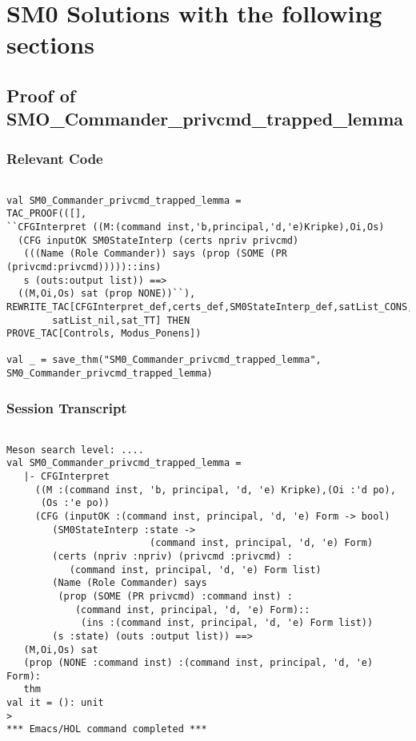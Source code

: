 \documentclass{report}
\begin{document}
\chapter{SM0 Solutions with the following sections}
\label{sm0-solutions}

\section{Proof of SMO_Commander_privcmd_trapped_lemma}
\label{proof-1}

\subsection{Relevant Code}
\label{rel-code-1}
\begin{lstlisting}[frame=TBlr]

val SM0_Commander_privcmd_trapped_lemma =
TAC_PROOF(([],
``CFGInterpret ((M:(command inst,'b,principal,'d,'e)Kripke),Oi,Os)
  (CFG inputOK SM0StateInterp (certs npriv privcmd)
   (((Name (Role Commander)) says (prop (SOME (PR (privcmd:privcmd)))))::ins)
   s (outs:output list)) ==>
  ((M,Oi,Os) sat (prop NONE))``),
REWRITE_TAC[CFGInterpret_def,certs_def,SM0StateInterp_def,satList_CONS,
	    satList_nil,sat_TT] THEN
PROVE_TAC[Controls, Modus_Ponens])

val _ = save_thm("SM0_Commander_privcmd_trapped_lemma",
SM0_Commander_privcmd_trapped_lemma)
\end{lstlisting}

\subsection{Session Transcript}
\label{trans1}
\begin{session}
  \begin{scriptsize}
\begin{verbatim}

Meson search level: ....
val SM0_Commander_privcmd_trapped_lemma =
   |- CFGInterpret
     ((M :(command inst, 'b, principal, 'd, 'e) Kripke),(Oi :'d po),
      (Os :'e po))
     (CFG (inputOK :(command inst, principal, 'd, 'e) Form -> bool)
        (SM0StateInterp :state ->
                         (command inst, principal, 'd, 'e) Form)
        (certs (npriv :npriv) (privcmd :privcmd) :
           (command inst, principal, 'd, 'e) Form list)
        (Name (Role Commander) says
         (prop (SOME (PR privcmd) :command inst) :
            (command inst, principal, 'd, 'e) Form)::
             (ins :(command inst, principal, 'd, 'e) Form list))
        (s :state) (outs :output list)) ==>
   (M,Oi,Os) sat
   (prop (NONE :command inst) :(command inst, principal, 'd, 'e) Form):
   thm
val it = (): unit
> 
*** Emacs/HOL command completed ***


\end{verbatim}
  \end{scriptsize}
\end{session}
\pagebreak
\end{document}
